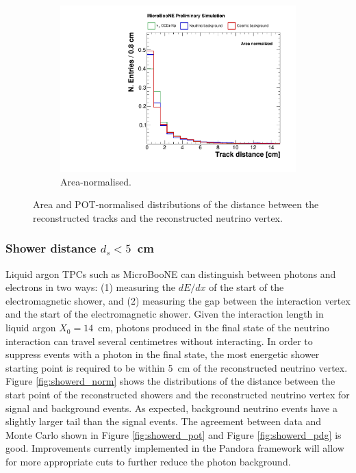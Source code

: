 \begin{figure}[htbp]
\begin{subfigure}{0.49\textwidth}
    \includegraphics[width=\linewidth]{figures/h_track_distance_norm.pdf}
    \caption{Area-normalised.} \label{fig:trackd_norm}
  \end{subfigure}
  \caption{Area and POT-normalised distributions of the distance between the reconstructed tracks and the reconstructed neutrino vertex.}
\end{figure}

\subsubsection*{Shower distance $d_{s} < 5$~cm}
Liquid argon TPCs such as MicroBooNE can distinguish between photons and electrons in two ways: (1) measuring the $dE/dx$ of the start of the electromagnetic shower, and (2) measuring the gap between the interaction vertex and the start of the electromagnetic shower. Given the interaction length in liquid argon $X_{0}=14$~cm, photons produced in the final state of the neutrino interaction can travel several centimetres without interacting. In order to suppress events with a photon in the final state, the most energetic shower starting point is required to be within 5~cm of the reconstructed neutrino vertex.
Figure \ref{fig:showerd_norm} shows the distributions of the distance between the start point of the reconstructed showers and the reconstructed neutrino vertex for signal and background events. As expected, background neutrino events have a slightly larger tail than the signal events. The agreement between data and Monte Carlo shown in Figure \ref{fig:showerd_pot} {and Figure \ref{fig:showerd_pdg}} is good. Improvements currently implemented in the Pandora framework will allow for more appropriate cuts to further reduce the photon background.

